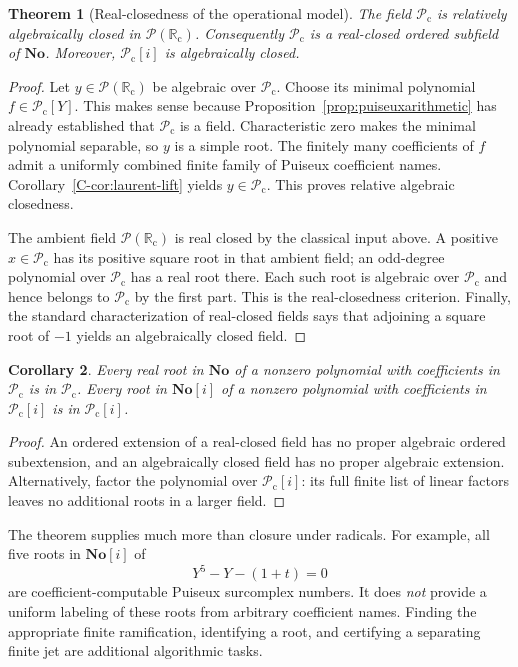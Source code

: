 \documentclass[11pt,letterpaper]{article}
\numberwithin{equation}{section}
\newtheorem{theorem}{Theorem}[section]
\newtheorem{corollary}[theorem]{Corollary}
\theoremstyle{definition}
\theoremstyle{remark}
\newcommand{\PP}{\mathcal P}
\newcommand{\No}{\mathbf{No}}
\newcommand{\Rc}{\mathbb R_{\mathrm c}}
\newcommand{\Pc}{\mathcal P_{\mathrm c}}
\begin{document}
\begin{theorem}[Real-closedness of the operational model]
\label{C-thm:pc-realclosed}
The field $\Pc$ is relatively algebraically closed in $\PP(\Rc)$.
Consequently $\Pc$ is a real-closed ordered subfield of $\No$.
Moreover, $\Pc[i]$ is algebraically closed.
\end{theorem}
\begin{proof}
Let $y\in\PP(\Rc)$ be algebraic over $\Pc$. Choose its minimal polynomial
$f\in\Pc[Y]$. This makes sense because Proposition~\ref{prop:puiseuxarithmetic} has
already established that $\Pc$ is a field. Characteristic zero makes the
minimal polynomial separable, so $y$ is a simple root. The finitely many
coefficients of $f$ admit a uniformly combined finite family of Puiseux
coefficient names. Corollary~\ref{C-cor:laurent-lift} yields $y\in\Pc$.
This proves relative algebraic closedness.

The ambient field $\PP(\Rc)$ is real closed by the classical input above.
A positive $x\in\Pc$ has its positive square root in that ambient field;
an odd-degree polynomial over $\Pc$ has a real root there. Each such root
is algebraic over $\Pc$ and hence belongs to $\Pc$ by the first part.
This is the real-closedness criterion. Finally, the standard
characterization of real-closed fields says that adjoining a square root
of $-1$ yields an algebraically closed field.
\end{proof}

\begin{corollary}
Every real root in $\No$ of a nonzero polynomial with coefficients in $\Pc$
is in $\Pc$. Every root in $\No[i]$ of a nonzero polynomial with coefficients
in $\Pc[i]$ is in $\Pc[i]$.
\end{corollary}
\begin{proof}
An ordered extension of a real-closed field has no proper algebraic ordered
subextension, and an algebraically closed field has no proper algebraic
extension. Alternatively, factor the polynomial over $\Pc[i]$: its full
finite list of linear factors leaves no additional roots in a larger field.
\end{proof}

The theorem supplies much more than closure under radicals. For example,
all five roots in $\No[i]$ of
\[
 Y^5-Y-(1+t)=0
\]
are coefficient-computable Puiseux surcomplex numbers. It does \emph{not}
provide a uniform labeling of these roots from arbitrary coefficient names.
Finding the appropriate finite ramification, identifying a root, and
certifying a separating finite jet are additional algorithmic tasks.
\end{document}
